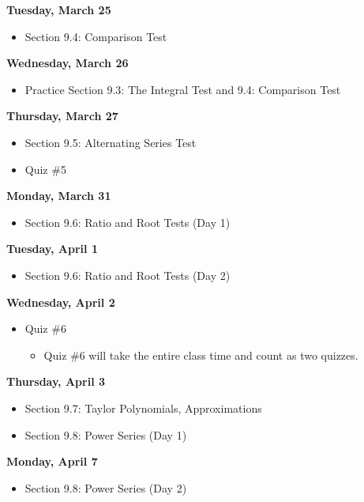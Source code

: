 \documentclass[11pt]{article}
\begin{document}
\textbf{Tuesday, March 25}

\begin{itemize}
\item Section 9.4: Comparison Test
\end{itemize}

\textbf{Wednesday, March 26}

\begin{itemize}
\item Practice Section 9.3: The Integral Test and 9.4: Comparison Test
\end{itemize}

\textbf{Thursday, March 27}

\begin{itemize}
\item Section 9.5: Alternating Series Test
\item Quiz \#5
\end{itemize}

\textbf{Monday, March 31}

\begin{itemize}
\item Section 9.6: Ratio and Root Tests (Day 1)
\end{itemize}

\textbf{Tuesday, April 1}

\begin{itemize}
\item Section 9.6: Ratio and Root Tests (Day 2)
\end{itemize}

\textbf{Wednesday, April 2}

\begin{itemize}
\item Quiz \#6\begin{itemize}
\item Quiz \#6 will take the entire class time and count as two quizzes.
\end{itemize}
\end{itemize}

\textbf{Thursday, April 3}

\begin{itemize}
\item Section 9.7: Taylor Polynomials, Approximations
\item Section 9.8: Power Series (Day 1)
\end{itemize}

\textbf{Monday, April 7}

\begin{itemize}
\item Section 9.8: Power Series (Day 2)
\end{itemize}
\end{document}

